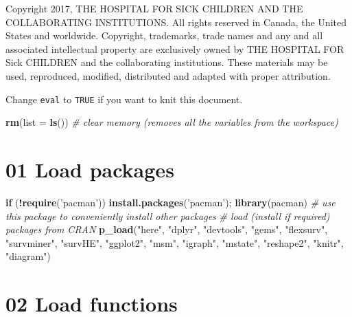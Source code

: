 \documentclass[
]{article}
\newenvironment{Shaded}{\begin{snugshade}}{\end{snugshade}}
\newcommand{\CommentTok}[1]{\textcolor[rgb]{0.56,0.35,0.01}{\textit{#1}}}
\newcommand{\ControlFlowTok}[1]{\textcolor[rgb]{0.13,0.29,0.53}{\textbf{#1}}}
\newcommand{\DataTypeTok}[1]{\textcolor[rgb]{0.13,0.29,0.53}{#1}}
\newcommand{\KeywordTok}[1]{\textcolor[rgb]{0.13,0.29,0.53}{\textbf{#1}}}
\newcommand{\NormalTok}[1]{#1}
\newcommand{\OperatorTok}[1]{\textcolor[rgb]{0.81,0.36,0.00}{\textbf{#1}}}
\newcommand{\StringTok}[1]{\textcolor[rgb]{0.31,0.60,0.02}{#1}}
\begin{document}
Copyright 2017, THE HOSPITAL FOR SICK CHILDREN AND THE COLLABORATING
INSTITUTIONS. All rights reserved in Canada, the United States and
worldwide. Copyright, trademarks, trade names and any and all associated
intellectual property are exclusively owned by THE HOSPITAL FOR Sick
CHILDREN and the collaborating institutions. These materials may be
used, reproduced, modified, distributed and adapted with proper
attribution.

\newpage

Change \texttt{eval} to \texttt{TRUE} if you want to knit this document.

\begin{Shaded}
\begin{Highlighting}[]
\KeywordTok{rm}\NormalTok{(}\DataTypeTok{list =} \KeywordTok{ls}\NormalTok{())      }\CommentTok{# clear memory (removes all the variables from the workspace)}
\end{Highlighting}
\end{Shaded}

\hypertarget{load-packages}{%
\section{01 Load packages}\label{load-packages}}

\begin{Shaded}
\begin{Highlighting}[]
\ControlFlowTok{if}\NormalTok{ (}\OperatorTok{!}\KeywordTok{require}\NormalTok{(}\StringTok{'pacman'}\NormalTok{)) }\KeywordTok{install.packages}\NormalTok{(}\StringTok{'pacman'}\NormalTok{); }\KeywordTok{library}\NormalTok{(pacman) }\CommentTok{# use this package to conveniently install other packages}
\CommentTok{# load (install if required) packages from CRAN}
\KeywordTok{p_load}\NormalTok{(}\StringTok{"here"}\NormalTok{, }\StringTok{"dplyr"}\NormalTok{, }\StringTok{"devtools"}\NormalTok{, }\StringTok{"gems"}\NormalTok{, }\StringTok{"flexsurv"}\NormalTok{, }\StringTok{"survminer"}\NormalTok{, }\StringTok{"survHE"}\NormalTok{, }\StringTok{"ggplot2"}\NormalTok{, }\StringTok{"msm"}\NormalTok{, }\StringTok{"igraph"}\NormalTok{, }\StringTok{"mstate"}\NormalTok{,   }\StringTok{"reshape2"}\NormalTok{, }\StringTok{"knitr"}\NormalTok{, }\StringTok{"diagram"}\NormalTok{)                                                  }
\end{Highlighting}
\end{Shaded}

\hypertarget{load-functions}{%
\section{02 Load functions}\label{load-functions}}
\end{document}
